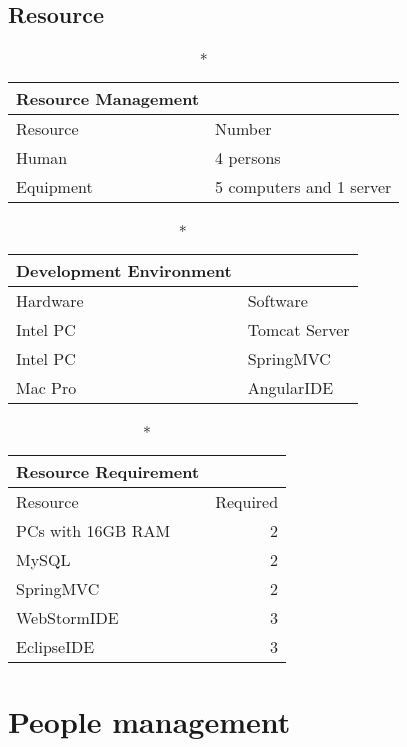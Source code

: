 \documentclass[a4paper,11pt]{article}
\begin{document}
\subsection{Resource}
\begin{center}
\begin{longtable}{|l|l|}
\caption*{Resource Management} \\
\hline Resource  & Number \\
\hline Human     & 4 persons \\
\hline Equipment & 5 computers and 1 server \\
\hline
\end{longtable}

\begin{longtable}{|l|l|}
\caption*{Development Environment} \\
\hline Hardware & Software \\
\hline Intel PC & Tomcat Server \\
\hline Intel PC & SpringMVC \\
\hline Mac Pro  & AngularIDE \\
\hline
\end{longtable}

\begin{longtable}{|l|r|}
\caption*{Resource Requirement} \\
\hline Resource          & Required \\
\hline PCs with 16GB RAM & 2 \\
\hline MySQL             & 2 \\
\hline SpringMVC         & 2 \\
\hline WebStormIDE       & 3 \\
\hline EclipseIDE        & 3 \\
\hline
\end{longtable}
\end{center}

\section{People management}
\end{document}
